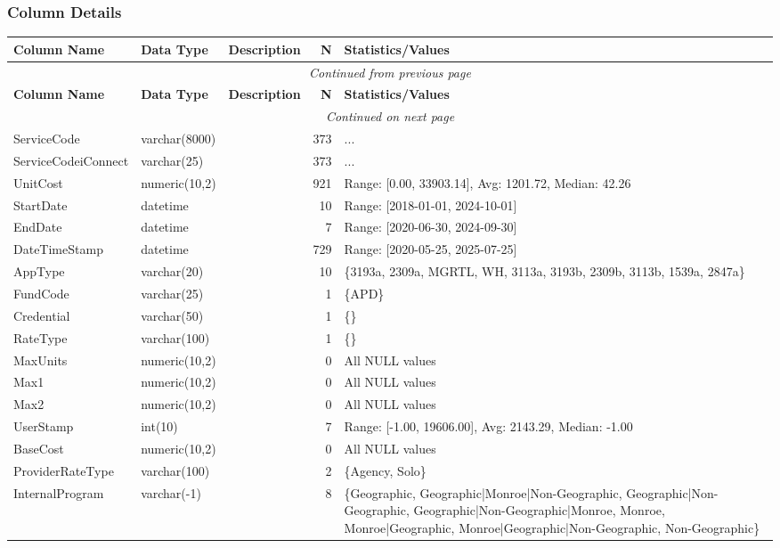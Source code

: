\begin{landscape}
\subsubsection{Column Details}
\begin{longtable}{|l|l|l|r|p{6cm}|}
\hline
\textbf{Column Name} & \textbf{Data Type} & \textbf{Description} & \textbf{N} & \textbf{Statistics/Values} \\
\hline
\endfirsthead
\multicolumn{5}{c}{\textit{Continued from previous page}} \\
\hline
\textbf{Column Name} & \textbf{Data Type} & \textbf{Description} & \textbf{N} & \textbf{Statistics/Values} \\
\hline
\endhead
\hline
\multicolumn{5}{c}{\textit{Continued on next page}} \\
\endfoot
\hline
\endlastfoot
ServiceCode & varchar(8000) &  & 373 & ... \\
\hline
ServiceCodeiConnect & varchar(25) &  & 373 & ... \\
\hline
UnitCost & numeric(10,2) &  & 921 & Range: [0.00, 33903.14], Avg: 1201.72, Median: 42.26 \\
\hline
StartDate & datetime &  & 10 & Range: [2018-01-01, 2024-10-01] \\
\hline
EndDate & datetime &  & 7 & Range: [2020-06-30, 2024-09-30] \\
\hline
DateTimeStamp & datetime &  & 729 & Range: [2020-05-25, 2025-07-25] \\
\hline
AppType & varchar(20) &  & 10 & \{3193a, 2309a, MGRTL, WH, 3113a, 3193b, 2309b, 3113b, 1539a, 2847a\} \\
\hline
FundCode & varchar(25) &  & 1 & \{APD\} \\
\hline
Credential & varchar(50) &  & 1 & \{\} \\
\hline
RateType & varchar(100) &  & 1 & \{\} \\
\hline
MaxUnits & numeric(10,2) &  & 0 & All NULL values \\
\hline
Max1 & numeric(10,2) &  & 0 & All NULL values \\
\hline
Max2 & numeric(10,2) &  & 0 & All NULL values \\
\hline
UserStamp & int(10) &  & 7 & Range: [-1.00, 19606.00], Avg: 2143.29, Median: -1.00 \\
\hline
BaseCost & numeric(10,2) &  & 0 & All NULL values \\
\hline
ProviderRateType & varchar(100) &  & 2 & \{Agency, Solo\} \\
\hline
InternalProgram & varchar(-1) &  & 8 & \{Geographic, Geographic|Monroe|Non-Geographic, Geographic|Non-Geographic, Geographic|Non-Geographic|Monroe, Monroe, Monroe|Geographic, Monroe|Geographic|Non-Geographic, Non-Geographic\} \\

\end{longtable}
\end{landscape}
